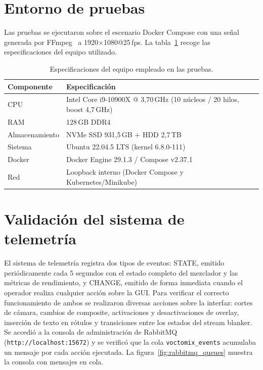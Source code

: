 \section{Entorno de pruebas}
\label{sec:entorno_pruebas}

Las pruebas se ejecutaron sobre el escenario Docker Compose con una señal
generada por FFmpeg~\cite{ffmpeg_project} a 1920$\times$1080@25\,fps. La tabla~\ref{tab:hardware} recoge
las especificaciones del equipo utilizado.

\begin{table}[H]
  \centering
  \caption{Especificaciones del equipo empleado en las pruebas.}
  \label{tab:hardware}
  \small
  \begin{tabular}{|l|l|}
    \hline
    \textbf{Componente} & \textbf{Especificación} \\
    \hline
    CPU      & Intel Core i9-10900X @ 3{,}70\,GHz (10 núcleos / 20 hilos, boost 4{,}7\,GHz) \\
    RAM      & 128\,GB DDR4 \\
    Almacenamiento & NVMe SSD 931{,}5\,GB + HDD 2{,}7\,TB \\
    Sistema  & Ubuntu 22.04.5 LTS (kernel 6.8.0-111) \\
    Docker   & Docker Engine 29.1.3 / Compose v2.37.1 \\
    Red      & Loopback interno (Docker Compose y Kubernetes/Minikube) \\
    \hline
  \end{tabular}
\end{table}

\section{Validación del sistema de telemetría}
\label{sec:prueba_telemetria}

El sistema de telemetría registra dos tipos de eventos: STATE, emitido
periódicamente cada 5 segundos con el estado completo del mezclador y las métricas
de rendimiento, y CHANGE, emitido de forma inmediata cuando el operador
realiza cualquier acción sobre la GUI. Para verificar el correcto funcionamiento de
ambos se realizaron diversas acciones sobre la interfaz: cortes de cámara,
cambios de composite, activaciones y desactivaciones de overlay, inserción de
texto en rótulos y transiciones entre los estados del stream blanker. Se
accedió a la consola de administración de RabbitMQ
(\texttt{http://localhost:15672}) y se verificó que la cola
\texttt{voctomix\_events} acumulaba un mensaje por cada acción ejecutada. La
figura~\ref{fig:rabbitmq_queues} muestra la consola con mensajes en cola.

